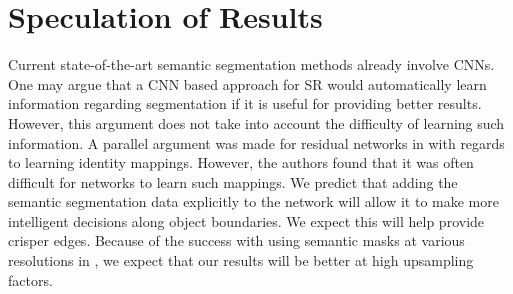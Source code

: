 \documentclass[10pt,twocolumn,letterpaper]{article}
\begin{document}
\section{Speculation of Results}
Current state-of-the-art semantic segmentation methods already involve CNNs.
One may argue that a CNN based approach for SR would automatically learn
information regarding segmentation if it is useful for providing better
results. However, this argument does not take into account the difficulty of
learning such information. A parallel argument was made for residual networks
in \cite{ResNet} with regards to learning identity mappings. However, the
authors found that it was often difficult for networks to learn such mappings.
We predict that adding the semantic segmentation data explicitly to the network
will allow it to make more intelligent decisions along object boundaries. We
expect this will help provide crisper edges. Because of the success with using
semantic masks at various resolutions in \cite{ImageSynthesis}, we expect that
our results will be better at high upsampling factors.

{\small


}
\end{document}
